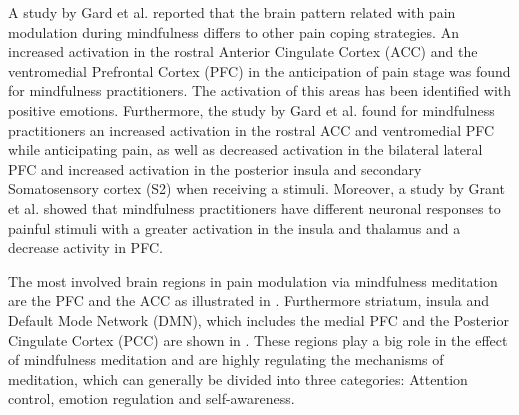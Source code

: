 
A study by Gard et al. \cite{Gard2012} reported that the brain pattern related with pain modulation during mindfulness differs to other pain coping strategies. An increased activation in the rostral Anterior Cingulate Cortex (ACC) and the ventromedial Prefrontal Cortex (PFC) in the anticipation of pain stage was found for mindfulness practitioners. The activation of this areas has been identified with positive emotions. \cite{Gard2012} Furthermore, the study by Gard et al. \cite{Gard2012} found for mindfulness practitioners an increased activation in the rostral ACC and ventromedial PFC while anticipating pain, as well as decreased activation in the bilateral lateral PFC and increased activation in the posterior insula and secondary Somatosensory cortex (S2) when receiving a stimuli. Moreover, a study by Grant et al. \cite{Grant2011} showed that mindfulness practitioners have different neuronal responses to painful stimuli with a greater activation in the insula and thalamus and a decrease activity in PFC.



The most involved brain regions in pain modulation via mindfulness meditation are the PFC and the ACC as illustrated in . Furthermore striatum, insula and Default Mode Network (DMN), which includes the medial PFC and the Posterior Cingulate Cortex (PCC) are shown in . These regions play a big role in the effect of mindfulness meditation and are highly regulating the mechanisms of meditation, which can generally be divided into three categories: Attention control, emotion regulation and self-awareness. 

